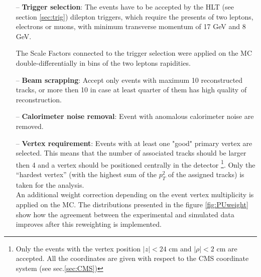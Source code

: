 \begin{itemize}
 \item [--] \textbf{Trigger selection}: The events have to be accepted by the HLT (see section \ref{sec:trig}) dilepton triggers, which require the presents of two leptons, electrons or muons, with
 minimum transverse momentum of 17 GeV and 8 GeV.
 
 The Scale Factors connected to the trigger selection were applied on the MC double-differentially in bins of the two leptons rapidities. 
 \item [--] \textbf{Beam scrapping}: Accept only events with maximum 10 reconstructed tracks, or more then 10 in case at least quarter of them has high quality of reconstruction.
 \item [--] \textbf{Calorimeter noise removal}: Event with anomalous calorimeter noise are removed.
 \item [--] \textbf{Vertex requirement}: Events with at least one "good" primary vertex are selected.
 This means that the number of associated tracks should be larger then 4 and a vertex should be positioned centrally in the detector
 \footnote{Only the events with the vertex position $|z| < \textrm{24 cm}$ and $|\rho| < \textrm{2 cm}$ are accepted. All the coordinates
 are given with respect to the CMS coordinate system (see sec.\ref{sec:CMS})}. Only the ``hardest vertex'' 
 (with the highest sum of the $p_{T}^{2}$ of the assigned tracks) is taken for the analysis. 
 \\
 An additional weight correction depending on the event vertex multiplicity is applied on the MC. 
 The distributions presented in the figure \ref{fig:PUweight} show how the agreement
 between the experimental and simulated data improves after this reweighting is implemented.
 

\end{itemize}
